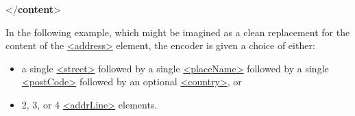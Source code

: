 \begin{shaded}
\hspace*{1em}\hspace*{1em}\mbox{}\newline 
\hspace*{1em}\hspace*{1em}\mbox{}\newline 
\hspace*{1em}\mbox{}\newline 
\hspace*{1em}\mbox{}\newline 
\hspace*{1em}\hspace*{1em}\mbox{}\newline 
\hspace*{1em}\hspace*{1em}\mbox{}\newline 
\hspace*{1em}\mbox{}\newline 
{}\mbox{}\newline 
{</\textbf{content}>}\end{shaded}\egroup\par \noindent  In the following example, which might be imagined as a clean replacement for the content of the \hyperref[TEI.address]{<address>} element, the encoder is given a choice of either: \begin{itemize}
\item a single \hyperref[TEI.street]{<street>} followed by a single \hyperref[TEI.placeName]{<placeName>} followed by a single \hyperref[TEI.postCode]{<postCode>} followed by an optional \hyperref[TEI.country]{<country>}, or
\item 2, 3, or 4 \hyperref[TEI.addrLine]{<addrLine>} elements.

\end{itemize}

